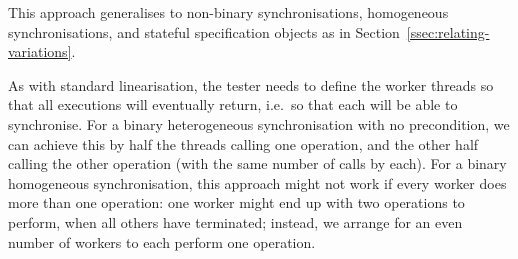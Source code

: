 
This approach generalises to non-binary synchronisations, homogeneous
synchronisations, and stateful specification objects as in
Section~\ref{ssec:relating-variations}.


As with standard linearisation, the tester needs to define the worker threads
so that all executions will eventually return, i.e.~so that each will be able
to synchronise.  For a binary heterogeneous synchronisation with no
precondition, we can achieve this by half the threads calling one operation,
and the other half calling the other operation (with the same number of calls
by each).  For a binary homogeneous synchronisation, this approach might not
work if every worker does more than one operation: one worker might end up
with two operations to perform, when all others have terminated; instead, we
arrange for an even number of workers to each perform one operation.

